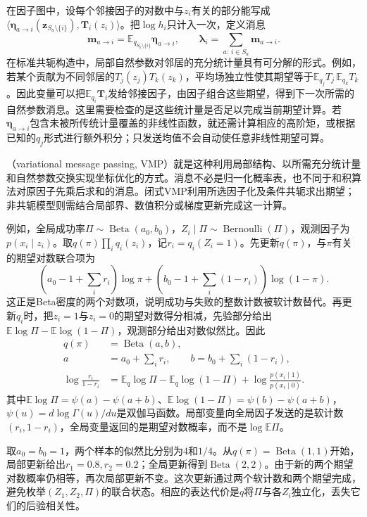 在因子图中，设每个邻接因子的对数中与$z_i$有关的部分能写成$\langle\bm{\eta}_{a\to i}(\bm z_{S_a\setminus\{i\}}),\bm T_i(z_i)\rangle$。把$\log h_i$只计入一次，定义消息
\[
  \bm m_{a\to i}
    =\mathbb E_{q_{S_a\setminus\{i\}}}\bm{\eta}_{a\to i},
  \qquad
  \bm{\lambda}_i=\sum_{a:\,i\in S_a}\bm m_{a\to i}.
\]
在标准共轭构造中，局部自然参数对邻居的充分统计量具有可分解的形式。例如，若某个贡献为不同邻居的$T_j(z_j)T_k(z_k)$，平均场独立性使其期望等于$\mathbb E_{q_j}T_j\,\mathbb E_{q_k}T_k$。因此变量可以把$\mathbb E_{q_i}\bm T_i$发给邻接因子，由因子组合这些期望，得到下一次所需的自然参数消息。这里需要检查的是这些统计量是否足以完成当前期望计算。若$\bm\eta_{a\to i}$包含未被所传统计量覆盖的非线性函数，就还需计算相应的高阶矩，或根据已知的$q_j$形式进行额外积分；只发送均值不会自动使任意非线性期望可算。

（variational message passing, VMP）就是这种利用局部结构、以所需充分统计量和自然参数交换实现坐标优化的方式。消息不必是归一化概率表，也不同于和积算法对原因子先乘后求和的消息。闭式VMP利用所选因子化及条件共轭求出期望；非共轭模型则需结合局部界、数值积分或梯度更新完成这一计算。

例如，全局成功率$\Pi\sim\operatorname{Beta}(a_0,b_0)$，$Z_i\mid\Pi\sim\operatorname{Bernoulli}(\Pi)$，观测因子为$p(x_i\mid z_i)$。取$q(\pi)\prod_iq_i(z_i)$，记$r_i=q_i(Z_i=1)$。先更新$q(\pi)$，与$\pi$有关的期望对数联合项为
\[
  \left(a_0-1+\sum_i r_i\right)\log\pi
   +\left(b_0-1+\sum_i(1-r_i)\right)\log(1-\pi).
\]
这正是Beta密度的两个对数项，说明成功与失败的整数计数被软计数替代。再更新$q_i$时，把$z_i=1$与$z_i=0$的期望对数得分相减，先验部分给出$\mathbb E\log\Pi-\mathbb E\log(1-\Pi)$，观测部分给出对数似然比。因此
\begin{equation}
  \begin{aligned}
    q(\pi)&=\operatorname{Beta}(a,b),\\
    a&=a_0+\sum_i r_i,\qquad
    b=b_0+\sum_i(1-r_i),\\
    \log\frac{r_i}{1-r_i}
      &=\mathbb E_q\log\Pi-\mathbb E_q\log(1-\Pi)
         +\log\frac{p(x_i\mid1)}{p(x_i\mid0)}.
  \end{aligned}
  \label{eq:pgm-variational-beta-bernoulli}
\end{equation}
其中$\mathbb E\log\Pi=\psi(a)-\psi(a+b)$、$\mathbb E\log(1-\Pi)=\psi(b)-\psi(a+b)$，$\psi(u)=d\log\Gamma(u)/du$是双伽马函数。局部变量向全局因子发送的是软计数$(r_i,1-r_i)$，全局变量返回的是期望对数概率，而不是$\log\mathbb E\Pi$。

取$a_0=b_0=1$，两个样本的似然比分别为$4$和$1/4$。从$q(\pi)=\operatorname{Beta}(1,1)$开始，局部更新给出$r_1=0.8,r_2=0.2$；全局更新得到$\operatorname{Beta}(2,2)$。由于新的两个期望对数概率仍相等，再次局部更新不变。这次更新通过两个软计数和两个期望完成，避免枚举$(Z_1,Z_2,\Pi)$的联合状态。相应的表达代价是$q$将$\Pi$与各$Z_i$独立化，丢失它们的后验相关性。

